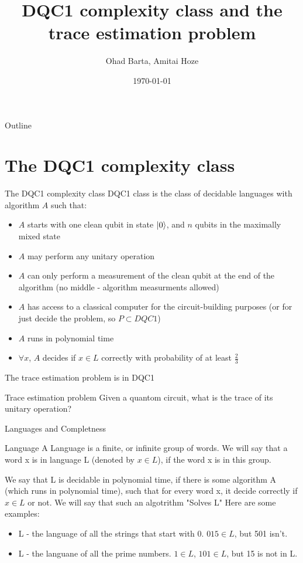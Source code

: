 \documentclass[leqno,fleqn]{beamer}
\author{Ohad Barta, Amitai Hoze}
\date{\today}
\title{DQC1 complexity class and the trace estimation problem}
\begin{document}
\maketitle
\begin{frame}{Outline}
\tableofcontents
\end{frame}


\section{The DQC1 complexity class}
\label{sec-1}
\begin{frame}[label=sec-1-1]{The DQC1 complexity class}
DQC1 class is the class of decidable languages with algorithm \(A\) such that:

\begin{itemize}
\item \(A\) starts with one clean qubit in state \(\left\vert{0}\right\rangle\), and \(n\) qubits in
the maximally mixed state
\item \(A\) may perform any unitary operation
\item \(A\) can only perform a measurement of the clean qubit at the end of
the algorithm (no middle - algorithm measurments allowed)
\item \(A\) has access to a classical computer for the circuit-building purposes (or for just decide the problem, so 
\(P \subset DQC1\))
\item \(A\) runs in polynomial time
\item \(\forall x\), \(A\) decides if \(x \in L\) correctly with probability of
at least \(\frac{2}{3}\)
\end{itemize}
\end{frame}

\begin{frame}[label=sec-1-2]{The trace estimation problem is in DQC1}
\begin{block}{Trace estimation problem}
Given a quantom circuit, what is the trace of its unitary operation?
\end{block}
\end{frame}

\begin{frame}{Languages and Completness}
\begin{block}{Language}
A Language is a finite, or infinite group  of words. We will say that a word x is in language L (denoted by $x \in L$), 
if the word x is in this group.

We say that L is decidable in polynomial time, if there is some algorithm A (which runs in polynomial time), such that for every word x, it decide correctly if $x \in L$ or not.
We will say that such an algotrithm "Solves L"
Here are some examples:
\begin{itemize}
\item L - the language of all the strings that start with 0. $015 \in L$, but 501 isn't.
\item L - the languane of all the prime numbers. $1 \in L$, $101 \in L$, but 15 is not in L.
\end{itemize}
\end{block}
\end{frame}
\end{document}
